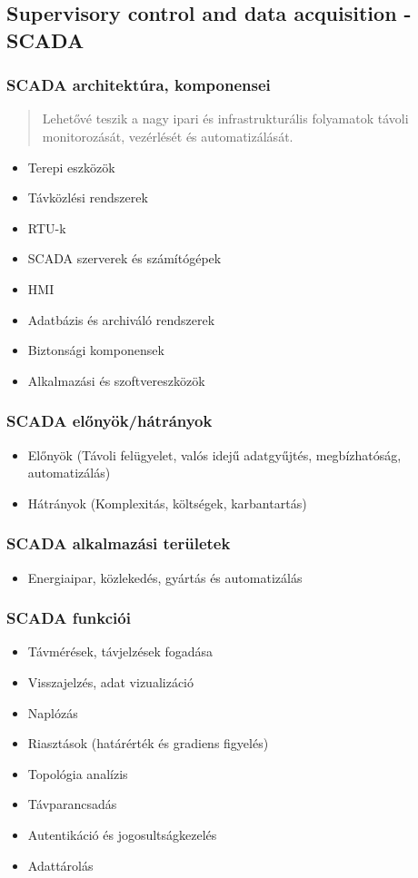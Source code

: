 \subsection{Supervisory control and data acquisition - SCADA}
\subsubsection{SCADA architektúra, komponensei}
\begin{quote}
    Lehetővé teszik a nagy ipari és infrastrukturális folyamatok távoli monitorozását, vezérlését és automatizálását.
\end{quote}
\begin{itemize}
    \item Terepi eszközök
    \item Távközlési rendszerek
    \item RTU-k
    \item SCADA szerverek és számítógépek
    \item HMI
    \item Adatbázis és archiváló rendszerek
    \item Biztonsági komponensek
    \item Alkalmazási és szoftvereszközök
\end{itemize}

\subsubsection{SCADA előnyök/hátrányok}
\begin{itemize}
    \item Előnyök (Távoli felügyelet, valós idejű adatgyűjtés, megbízhatóság, automatizálás)
    \item Hátrányok (Komplexitás, költségek, karbantartás)
\end{itemize}

\subsubsection{SCADA alkalmazási területek}
\begin{itemize}
    \item Energiaipar, közlekedés, gyártás és automatizálás
\end{itemize}

\clearpage
\subsubsection{SCADA funkciói}
\begin{itemize}
    \item Távmérések, távjelzések fogadása
    \item Visszajelzés, adat vizualizáció
    \item Naplózás
    \item Riasztások (határérték és gradiens figyelés)
    \item Topológia analízis
    \item Távparancsadás
    \item Autentikáció és jogosultságkezelés
    \item Adattárolás
\end{itemize}

